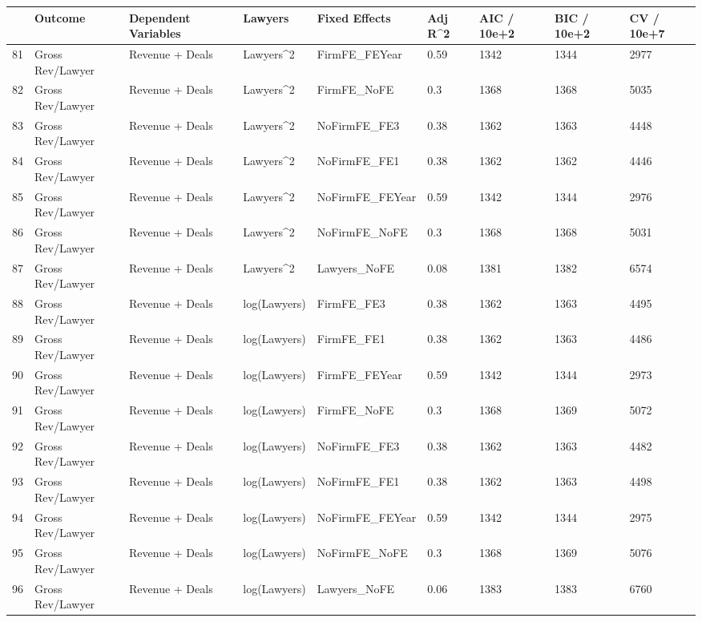 \begin{table}[ht]
\centering
\begin{tabular}{rllllllll}
  \hline
 & Outcome & Dependent Variables & Lawyers & Fixed Effects & Adj R^2 & AIC / 10e+2 & BIC / 10e+2 & CV / 10e+7 \\ 
  \hline
81 & Gross Rev/Lawyer & Revenue + Deals & Lawyers^2 & FirmFE\_FEYear & 0.59 & 1342 & 1344 & 2977 \\ 
  82 & Gross Rev/Lawyer & Revenue + Deals & Lawyers^2 & FirmFE\_NoFE & 0.3 & 1368 & 1368 & 5035 \\ 
  83 & Gross Rev/Lawyer & Revenue + Deals & Lawyers^2 & NoFirmFE\_FE3 & 0.38 & 1362 & 1363 & 4448 \\ 
  84 & Gross Rev/Lawyer & Revenue + Deals & Lawyers^2 & NoFirmFE\_FE1 & 0.38 & 1362 & 1362 & 4446 \\ 
  85 & Gross Rev/Lawyer & Revenue + Deals & Lawyers^2 & NoFirmFE\_FEYear & 0.59 & 1342 & 1344 & 2976 \\ 
  86 & Gross Rev/Lawyer & Revenue + Deals & Lawyers^2 & NoFirmFE\_NoFE & 0.3 & 1368 & 1368 & 5031 \\ 
  87 & Gross Rev/Lawyer & Revenue + Deals & Lawyers^2 & Lawyers\_NoFE & 0.08 & 1381 & 1382 & 6574 \\ 
  88 & Gross Rev/Lawyer & Revenue + Deals & log(Lawyers) & FirmFE\_FE3 & 0.38 & 1362 & 1363 & 4495 \\ 
  89 & Gross Rev/Lawyer & Revenue + Deals & log(Lawyers) & FirmFE\_FE1 & 0.38 & 1362 & 1363 & 4486 \\ 
  90 & Gross Rev/Lawyer & Revenue + Deals & log(Lawyers) & FirmFE\_FEYear & 0.59 & 1342 & 1344 & 2973 \\ 
  91 & Gross Rev/Lawyer & Revenue + Deals & log(Lawyers) & FirmFE\_NoFE & 0.3 & 1368 & 1369 & 5072 \\ 
  92 & Gross Rev/Lawyer & Revenue + Deals & log(Lawyers) & NoFirmFE\_FE3 & 0.38 & 1362 & 1363 & 4482 \\ 
  93 & Gross Rev/Lawyer & Revenue + Deals & log(Lawyers) & NoFirmFE\_FE1 & 0.38 & 1362 & 1363 & 4498 \\ 
  94 & Gross Rev/Lawyer & Revenue + Deals & log(Lawyers) & NoFirmFE\_FEYear & 0.59 & 1342 & 1344 & 2975 \\ 
  95 & Gross Rev/Lawyer & Revenue + Deals & log(Lawyers) & NoFirmFE\_NoFE & 0.3 & 1368 & 1369 & 5076 \\ 
  96 & Gross Rev/Lawyer & Revenue + Deals & log(Lawyers) & Lawyers\_NoFE & 0.06 & 1383 & 1383 & 6760 \\ 

\end{tabular}
\end{table}
